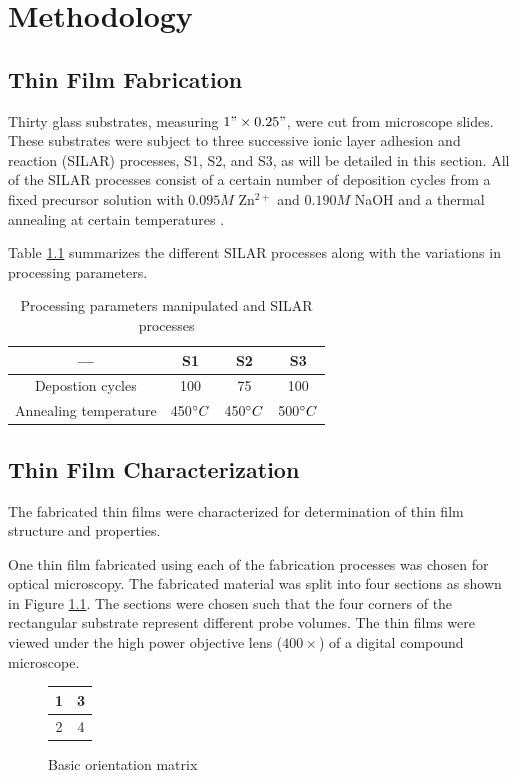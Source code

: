 \chapter{Methodology}
\section{Thin Film Fabrication}
Thirty glass substrates, measuring $1"\times0.25"$, were cut from microscope slides.
These substrates were subject to three successive ionic layer adhesion and reaction (SILAR) processes, S1, S2, and S3, as will be detailed in this section.
All of the SILAR processes consist of a certain number of deposition cycles from a fixed precursor solution with $0.095M$ Zn$^{2+}$ and $0.190M$ NaOH and a thermal annealing at certain temperatures \cite{florido17, gao08}.

Table \ref{tab:processes} summarizes the different SILAR processes along with the variations in processing parameters.

\begin{table}
  \caption{Processing parameters manipulated and SILAR processes}
  \centering
  \begin{tabular}{c c c c}
    \hline\hline
    --- & S1 & S2 & S3 \\
    \hline
    Depostion cycles & 100 & 75 & 100 \\
    Annealing temperature & 450$^{\circ}C$ & 450$^{\circ}C$ & 500$^{\circ}C$ \\[1ex]
    \hline
  \end{tabular}
  \label{tab:processes}
\end{table}

\section{Thin Film Characterization}
The fabricated thin films were characterized for determination of thin film structure and properties.

One thin film fabricated using each of the fabrication processes was chosen for optical microscopy.
The fabricated material was split into four sections as shown in Figure \ref{fig:orient}.
The sections were chosen such that the four corners of the rectangular substrate represent different probe volumes.
The thin films were viewed under the high power objective lens ($400\times$) of a digital compound microscope.

\begin{figure}
  \centering
  \begin{tabular}{| c | c |}
    \hline
    1 & 3 \\
    \hline
    2 & 4 \\[0.5ex]
    \hline
  \end{tabular}
  \caption{Basic orientation matrix}
  \label{fig:orient}
\end{figure}

